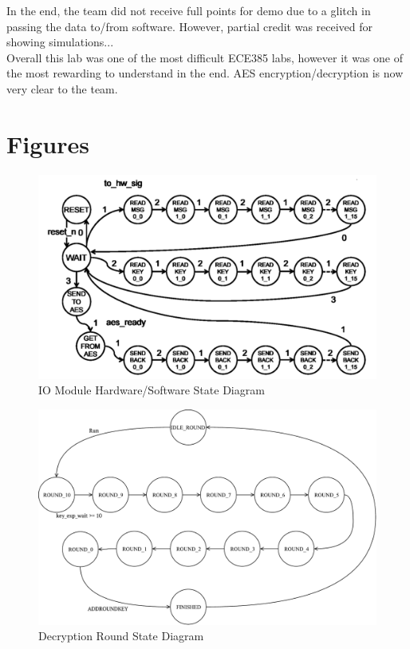 \documentclass[journal, twocolumn, final,11pt,letterpaper]{IEEEtran}
\begin{document}
In the end, the team did not receive full points for demo due to a glitch in passing the data to/from software. However, partial credit was received for showing simulations...\\

Overall this lab was one of the most difficult ECE385 labs, however it was one of the most rewarding to understand in the end. AES encryption/decryption is now very clear to the team.

\clearpage
\onecolumn
\section{Figures}


\begin{figure} [H]
	\centering
	\includegraphics[scale=.6]{IO_Module_State_Diagram.png}
	\caption{IO Module Hardware/Software State Diagram\label{fig:io-module}}
\end{figure}  


\begin{figure} [H]
	\centering
	\includegraphics[scale=.6]{Decryption_Round_State_Diagram.pdf}
	\caption{Decryption Round State Diagram\label{fig:round-state}}
\end{figure}          
\end{document}
